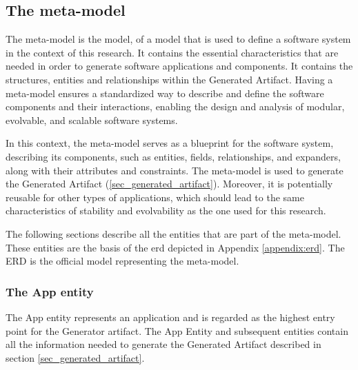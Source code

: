 \subsection{The meta-model} \label{sec_artifact_meta_model}

The meta-model is the model, of a model that is used to define a software system in the
context of this research. It contains the essential characteristics that are needed in
order to generate software applications and components. It contains the structures,
entities and relationships within the Generated Artifact. Having a meta-model ensures a
standardized way to describe and define the software components and their interactions,
enabling the design and analysis of modular, evolvable, and scalable software systems.

In this context, the meta-model serves as a blueprint for the software system, describing
its components, such as entities, fields, relationships, and expanders, along with their
attributes and constraints. The meta-model is used to generate the Generated Artifact
(\ref{sec_generated_artifact}). Moreover, it is potentially reusable for other types of
applications, which should lead to the same characteristics of stability and evolvability as
the one used for this research. 

The following sections describe all the entities that are part of the meta-model. These
entities are the basis of the \gls{erd} depicted in Appendix \ref{appendix:erd}. The ERD
is the official model representing the meta-model.

\subsubsection{The App entity}

The App entity represents an application and is regarded as the highest entry point for the
Generator artifact. The App Entity and subsequent entities contain all the information
needed to generate the Generated Artifact described in section \ref{sec_generated_artifact}. 

